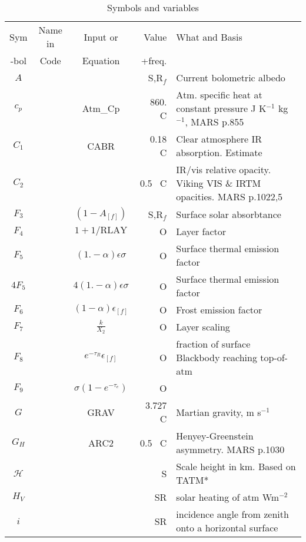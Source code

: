 \documentclass{article}
\begin{document}
\begin{table}[ht]
\caption{Symbols and variables}
\label{tab:sym}
\begin{center}
\begin{tabular}{ c c c r l } \hline 
Sym   & Name in & Input or  & Value  & What and Basis \\  
-bol  & Code    & Equation  & +freq. &  \\  
\hline  
$A$   & \ct{AS} &   & S,R$_f$ & Current bolometric albedo\\
$c_p$   & \ct{ATMCP} & Atm\_Cp  & 860. \ C & Atm. specific heat at constant
pressure J K$^{-1}$ kg$^{-1}$, MARS p.855\\
$C_1$    & \ct{CABR}  & CABR  & 0.18 \ C & Clear atmosphere IR absorption. Estimate  \\
$C_2$    & \ct{TAURAT}&       & 0.5 \ C & IR/vis relative opacity. 
                                Viking  VIS \& IRTM opacities. MARS p.1022,5  \\
$F_3$  & \ct{FAC3}   & $ (1-A_{[f]}) $   &  S,R$_f$ & Surface solar absorbtance  \\ 
$F_4$  & \ct{FAC4}   & $1+1/\mathrm{RLAY} $   & O &  Layer factor \\
$F_5$  & \ct{FAC5}   & $ (1.-\alpha) \epsilon \sigma  $   & O & Surface thermal
emission factor    \\ 
$4 F_5$  & \ct{FAC45} & $  4 (1.-\alpha) \epsilon \sigma  $   & O & Surface thermal
emission factor  \\ 
$F_6$  & \ct{FAC6}   & $(1-\alpha ) \epsilon_{[f]} $  & O & Frost emission factor \\
$F_7$  & \ct{FAC7}   & $ \frac{k}{X_2}$    & O & Layer scaling \\
$F_8$  & \ct{FAC8}   & $e^{-\tau_R} \epsilon _{[f]}$    & O & fraction of surface
Blackbody reaching top-of-atm  \\
$F_9$  & \ct{FAC9}   & $\sigma (1-e^{-\tau_e}) $    & O &    \\
$G$   & \ct{GRAV} & GRAV  & 3.727  \ C & Martian gravity, m s$^{-1}$ \\
$G_H$      & \ct{G0}    & ARC2  & 0.5 \ C & Henyey-Greenstein asymmetry.  MARS p.1030 \\
$\mathcal{H}$   & \ct{SCALEH} &  &  S & Scale height in km. Based on TATM*\\
$H_V$   & \ct{ADGR} &   & SR & solar heating of atm  Wm$^{-2}$\\
$i$   & \ct{} &   & SR &  incidence angle from zenith onto a horizontal surface\\

\end{tabular}
\end{center}
\end{table}
\end{document}
